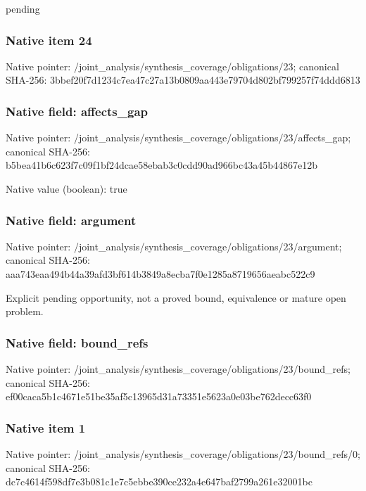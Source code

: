 \documentclass[10pt,a4paper]{article}
\begin{document}
\begingroup\raggedright\sloppy pending\par\endgroup

\subsubsection{Native item 24}
Native pointer: /joint\_\allowbreak{}analysis/synthesis\_\allowbreak{}coverage/obligations/23; canonical SHA-256: 3bbef20f7d1234c7ea47c27a13b0809aa443e79704d802bf799257f74ddd6813

\subsubsection{Native field: affects\_\allowbreak{}gap}
Native pointer: /joint\_\allowbreak{}analysis/synthesis\_\allowbreak{}coverage/obligations/23/affects\_\allowbreak{}gap; canonical SHA-256: b5bea41b6c623f7c09f1bf24dcae58ebab3c0cdd90ad966bc43a45b44867e12b

Native value (boolean): true

\subsubsection{Native field: argument}
Native pointer: /joint\_\allowbreak{}analysis/synthesis\_\allowbreak{}coverage/obligations/23/argument; canonical SHA-256: aaa743eaa494b44a39afd3bf614b3849a8ecba7f0e1285a8719656aeabc522c9

\begingroup\raggedright\sloppy Explicit pending opportunity,\allowbreak{} not a proved bound,\allowbreak{} equivalence or mature open problem.\par\endgroup

\subsubsection{Native field: bound\_\allowbreak{}refs}
Native pointer: /joint\_\allowbreak{}analysis/synthesis\_\allowbreak{}coverage/obligations/23/bound\_\allowbreak{}refs; canonical SHA-256: ef00caca5b1c4671e51be35af5c13965d31a73351e5623a0e03be762decc63f0

\subsubsection{Native item 1}
Native pointer: /joint\_\allowbreak{}analysis/synthesis\_\allowbreak{}coverage/obligations/23/bound\_\allowbreak{}refs/0; canonical SHA-256: dc7c4614f598df7e3b081c1e7c5ebbe390ce232a4e647baf2799a261e32001bc
\end{document}
